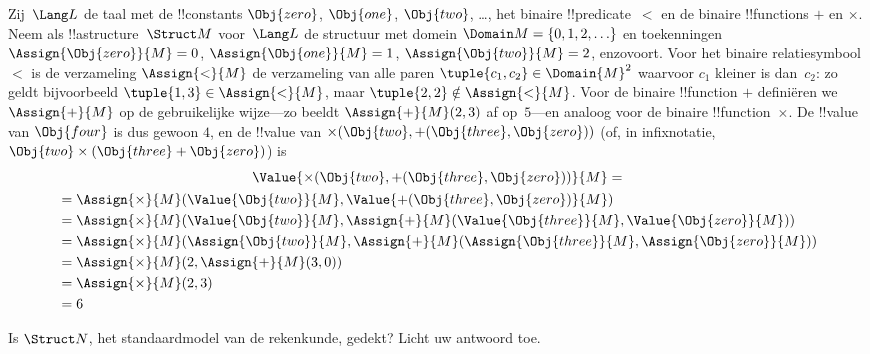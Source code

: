 \documentclass[../../../include/open-logic-section]{subfiles}
\begin{document}
\begin{ex}
Zij~$\Lang L$ de taal met de !!{constant}s $\Obj{zero}$,
$\Obj{one}$, $\Obj{two}$, \dots, het binaire !!{predicate}~$<$ en de
binaire !!{function}s $+$ en $\times$. Neem als !!a{structure}~$\Struct
M$ voor~$\Lang L$ de structuur met domein $\Domain M = \{0, 1, 2, \ldots
\}$ en toekenningen $\Assign{\Obj{zero}}{M} = 0$,
$\Assign{\Obj{one}}{M} = 1$, $\Assign{\Obj{two}}{M} = 2$, enzovoort.
Voor het binaire relatiesymbool $<$ is de verzameling $\Assign{<}{M}$
de verzameling van alle paren $\tuple{c_1, c_2} \in \Domain{M}^2$
waarvoor $c_1$ kleiner is dan~$c_2$: zo geldt bijvoorbeeld
$\tuple{1, 3} \in \Assign{<}{M}$, maar $\tuple{2, 2} \notin
\Assign{<}{M}$. Voor de binaire !!{function} $+$ definiëren we
$\Assign{+}{M}$ op de gebruikelijke wijze---zo beeldt
$\Assign{+}{M}(2,3)$ af op~$5$---en analoog voor de binaire
!!{function}~$\times$. De !!{value} van $\Obj{four}$ is dus gewoon
$4$, en de !!{value} van $\times(\Obj{two},
+(\Obj{three},\Obj{zero}))$ (of, in infixnotatie, $\Obj{two} \times
(\Obj{three} + \Obj{zero})$) is
\begin{multline*}
\Value{\times(\Obj{two}, +(\Obj{three},\Obj{zero}))}{M} =\\
\begin{aligned}
& =\Assign{\times}{M}(\Value{\Obj{two}}{M}, \Value{+(\Obj{three}, \Obj{zero})}{M})\\
& = \Assign{\times}{M}(\Value{\Obj{two}}{M}, \Assign{+}{M}(\Value{\Obj{three}}{M},
\Value{\Obj{zero}}{M})) \\
& = \Assign{\times}{M}(\Assign{\Obj{two}}{M}, \Assign{+}{M}(\Assign{\Obj{three}}{M},
\Assign{\Obj{zero}}{M})) \\
& = \Assign{\times}{M}(2, \Assign{+}{M}(3, 0)) \\
& = \Assign{\times}{M}(2, 3) \\
& = 6
\end{aligned}
\end{multline*}
\end{ex}

\begin{prob}
Is $\Struct N$, het standaardmodel van de rekenkunde, gedekt? Licht uw
antwoord toe.
\end{prob}
\end{document}
